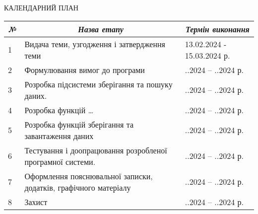 \documentclass[a4paper, 14pt]{article}
\begin{document}
\noindent
\begin{center}
    КАЛЕНДАРНИЙ ПЛАН \par \null \par
    \end{center}
  \begin{tabular}{|p{1em} | p{17em} | p{11em}|}
     \hline
        \multicolumn{1}{|c|}{\textit{№}} & \multicolumn{1}{c}{\textit{Назва етапу}} & \multicolumn{1}{|c|}{\textit{Термін виконання}} \\ \hline
    1 & Видача теми, узгодження і затвердження теми & 13.02.2024 - 15.03.2024 р. \\ \hline
    2 & Формулювання вимог до програми & \hspace{1em}.\hspace{1em}.2024 – \hspace{1em}.\hspace{1em}.2024 р. \\ \hline
    3 & Розробка підсистеми зберігання та пошуку даних. & \hspace{1em}.\hspace{1em}.2024 – \hspace{1em}.\hspace{1em}.2024 р. \\ \hline
    4 & Розробка функцій \ldots & \hspace{1em}.\hspace{1em}.2024 – \hspace{1em}.\hspace{1em}.2024 р. \\ \hline
    5 & Розробка функцій зберігання та завантаження даних & \hspace{1em}.\hspace{1em}.2024 – \hspace{1em}.\hspace{1em}.2024 р. \\ \hline
    6 & Тестування і доопрацювання розробленої програмної системи. & \hspace{1em}.\hspace{1em}.2024 – \hspace{1em}.\hspace{1em}.2024 р. \\ \hline
    7 & Оформлення пояснювальної записки, додатків, графічного матеріалу & \hspace{1em}.\hspace{1em}.2024 – \hspace{1em}.\hspace{1em}.2024 р. \\ \hline
    8 & Захист & \hspace{1em}.\hspace{1em}.2024 – \hspace{1em}.\hspace{1em}.2024 р. \\ \hline
  \end{tabular}
\end{document}
